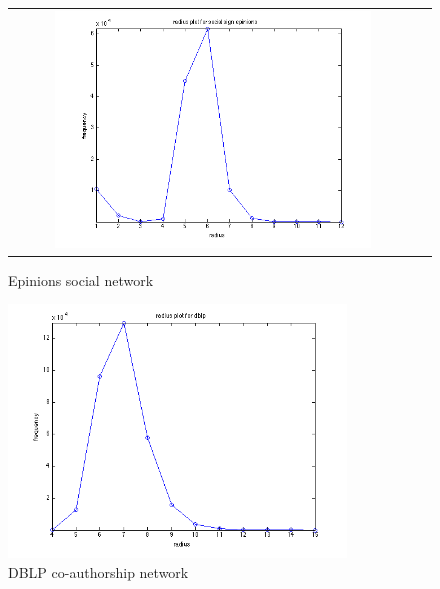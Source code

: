 \begin{figure}[!htbf]
\begin{center}
\begin{tabular}{cc}
     \includegraphics[width=0.8\textwidth]{FIG/t4_epinions.png} 
\end{tabular}
\caption{Epinions social network}
\label{t4:2}
\end{center}
\end{figure}


\begin{figure}[!htbf]
\begin{center}
     \includegraphics[width=0.8\textwidth]{FIG/t4_dblp.png} 
\caption{DBLP co-authorship network}
\label{t4:3}
\end{center}
\end{figure}


